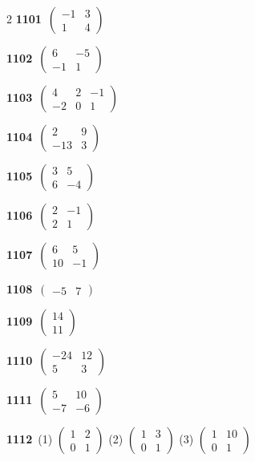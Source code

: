 \documentclass[10pt,a4paper]{article}
\begin{document}
\begin{multicols}{2}
\noindent\textbf{1101}\ $\begin{pmatrix} -1 & 3 \\ 1 & 4 \end{pmatrix}$\par
\noindent\textbf{1102}\ $\begin{pmatrix} 6 & -5 \\ -1 & 1 \end{pmatrix}$\par
\noindent\textbf{1103}\ $\begin{pmatrix} 4 & 2 & -1 \\ -2 & 0 & 1 \end{pmatrix}$\par
\noindent\textbf{1104}\ $\begin{pmatrix} 2 & 9 \\ -13 & 3 \end{pmatrix}$\par
\noindent\textbf{1105}\ $\begin{pmatrix} 3 & 5 \\ 6 & -4 \end{pmatrix}$\par
\noindent\textbf{1106}\ $\begin{pmatrix} 2 & -1 \\ 2 & 1 \end{pmatrix}$\par
\noindent\textbf{1107}\ $\begin{pmatrix} 6 & 5 \\ 10 & -1 \end{pmatrix}$\par
\noindent\textbf{1108}\ $\begin{pmatrix} -5 & 7 \end{pmatrix}$\par
\noindent\textbf{1109}\ $\begin{pmatrix} 14 \\ 11 \end{pmatrix}$\par
\noindent\textbf{1110}\ $\begin{pmatrix} -24 & 12 \\ 5 & 3 \end{pmatrix}$\par
\noindent\textbf{1111}\ $\begin{pmatrix} 5 & 10 \\ -7 & -6 \end{pmatrix}$\par
\noindent\textbf{1112}\ (1) $\begin{pmatrix} 1 & 2 \\ 0 & 1 \end{pmatrix}$ (2) $\begin{pmatrix} 1 & 3 \\ 0 & 1 \end{pmatrix}$ (3) $\begin{pmatrix} 1 & 10 \\ 0 & 1 \end{pmatrix}$\par

\end{multicols}
\end{document}
